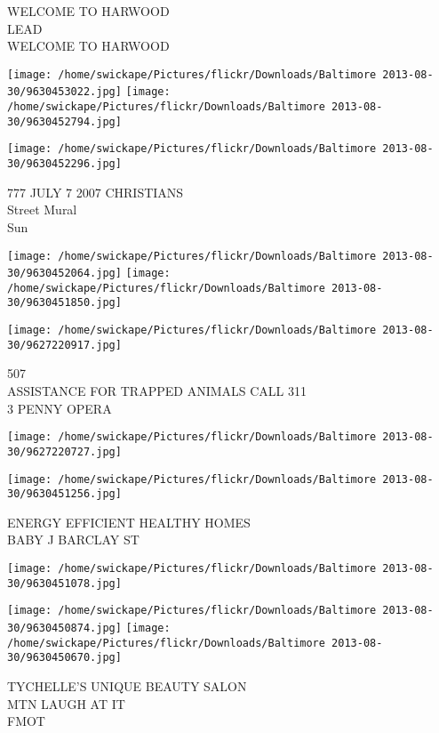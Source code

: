 \documentclass[10pt,letterpaper]{article}
\begin{document}
WELCOME TO HARWOOD\\
LEAD\\
WELCOME TO HARWOOD
\pagebreak

\texttt{[image: /home/swickape/Pictures/flickr/Downloads/Baltimore 2013-08-30/9630453022.jpg]}
\texttt{[image: /home/swickape/Pictures/flickr/Downloads/Baltimore 2013-08-30/9630452794.jpg]}

\vspace{0.25in}
\texttt{[image: /home/swickape/Pictures/flickr/Downloads/Baltimore 2013-08-30/9630452296.jpg]}

777 JULY 7 2007 CHRISTIANS\\
Street Mural\\
Sun
\pagebreak

\texttt{[image: /home/swickape/Pictures/flickr/Downloads/Baltimore 2013-08-30/9630452064.jpg]}
\texttt{[image: /home/swickape/Pictures/flickr/Downloads/Baltimore 2013-08-30/9630451850.jpg]}

\texttt{[image: /home/swickape/Pictures/flickr/Downloads/Baltimore 2013-08-30/9627220917.jpg]}

507\\
ASSISTANCE FOR TRAPPED ANIMALS CALL 311\\
3 PENNY OPERA
\pagebreak

\texttt{[image: /home/swickape/Pictures/flickr/Downloads/Baltimore 2013-08-30/9627220727.jpg]}

\vspace{0.25in}
\texttt{[image: /home/swickape/Pictures/flickr/Downloads/Baltimore 2013-08-30/9630451256.jpg]}

ENERGY EFFICIENT HEALTHY HOMES\\
BABY J BARCLAY ST
\pagebreak

\texttt{[image: /home/swickape/Pictures/flickr/Downloads/Baltimore 2013-08-30/9630451078.jpg]}

\vspace{0.25in}
\texttt{[image: /home/swickape/Pictures/flickr/Downloads/Baltimore 2013-08-30/9630450874.jpg]}
\texttt{[image: /home/swickape/Pictures/flickr/Downloads/Baltimore 2013-08-30/9630450670.jpg]}

TYCHELLE'S UNIQUE BEAUTY SALON\\
MTN LAUGH AT IT\\
FMOT
\pagebreak
\end{document}

